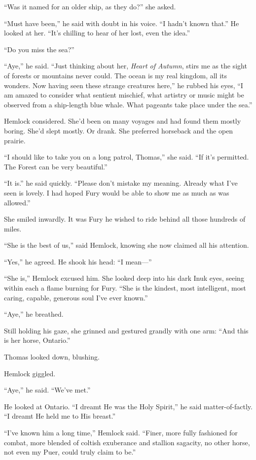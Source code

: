 \documentclass[11pt,a5paper]{article}
\begin{document}
``Was it named for an older ship, as they do?'' she asked.

``Must have been,'' he said with doubt in his voice. ``I hadn't known that.'' He looked at her. ``It's chilling to hear of her lost, even the idea.''

``Do you miss the sea?''

``Aye,'' he said. ``Just thinking about her, \emph{Heart of Autumn}, stirs me as the sight of forests or mountains never could. The ocean is my real kingdom, all its wonders. Now having seen these strange creatures here,'' he rubbed his eyes, ``I am amazed to consider what sentient mischief, what artistry or music might be observed from a ship-length blue whale. What pageants take place under the sea.''

Hemlock considered. She'd been on many voyages and had found them mostly boring. She'd slept mostly. Or drank. She preferred horseback and the open prairie.

``I should like to take you on a long patrol, Thomas,'' she said. ``If it's permitted. The Forest can be very beautiful.''

``It is.'' he said quickly. ``Please don't mistake my meaning. Already what I've seen is lovely. I had hoped Fury would be able to show me as much as was allowed.''

She smiled inwardly. It was Fury he wished to ride behind all those hundreds of miles.

``She is the best of us,'' said Hemlock, knowing she now claimed all his attention.

``Yes,'' he agreed. He shook his head: ``I mean---''

``She is,'' Hemlock excused him. She looked deep into his dark Inuk eyes, seeing within each a flame burning for Fury. ``She is the kindest, most intelligent, most caring, capable, generous soul I've ever known.''

``Aye,'' he breathed.

Still holding his gaze, she grinned and gestured grandly with one arm: ``And this is her horse, Ontario.''

Thomas looked down, blushing.

Hemlock giggled.

``Aye,'' he said. ``We've met.''

He looked at Ontario. ``I dreamt He was the Holy Spirit,'' he said matter-of-factly. ``I dreamt He held me to His breast.''

``I've known him a long time,'' Hemlock said. ``Finer, more fully fashioned for combat, more blended of coltish exuberance and stallion sagacity, no other horse, not even my Puer, could truly claim to be.''
\end{document}
